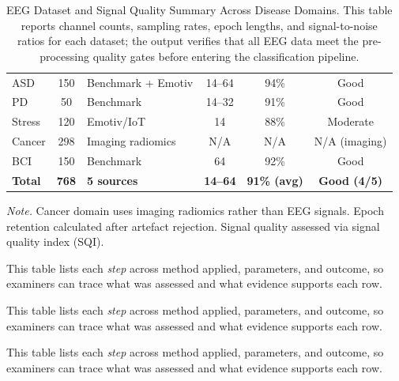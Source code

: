 {\tablestripes\tablefontsize
\begin{xltabular}{\textwidth}{@{} l c L c c c @{}}
\caption[EEG Dataset and Signal Quality Summary Across Disease]{EEG Dataset and Signal Quality Summary Across Disease Domains. This table reports channel counts, sampling rates, epoch lengths, and signal-to-noise ratios for each dataset; the output verifies that all EEG data meet the pre-processing quality gates before entering the classification pipeline.}\label{tab:eeg_dataset_summary} \\
\toprule
{} &  &  &  &  &  \\
\midrule
\endfirsthead
\endhead
\bottomrule
\endlastfoot
ASD & 150 & Benchmark + Emotiv & 14--64 & 94\% & Good \\
PD & 50 & Benchmark & 14--32 & 91\% & Good \\
Stress & 120 & Emotiv/IoT & 14 & 88\% & Moderate \\
Cancer & 298 & Imaging radiomics & N/A & N/A & N/A (imaging) \\
BCI & 150 & Benchmark & 64 & 92\% & Good \\
\midrule
\textbf{Total} & \textbf{768} & \textbf{5 sources} & \textbf{14--64} & \textbf{91\% (avg)} & \textbf{Good (4/5)} \\
\end{xltabular}}
\vspace{2pt}
\noindent\textit{Note.} Cancer domain uses imaging radiomics rather than EEG signals. Epoch retention calculated after artefact rejection. Signal quality assessed via signal quality index (SQI).
\fi %
\fi %

\noindent This table lists each \textit{step} across method applied, parameters, and outcome, so examiners can trace what was assessed and what evidence supports each row.

\iffalse %



\noindent This table lists each \textit{step} across method applied, parameters, and outcome, so examiners can trace what was assessed and what evidence supports each row.


\noindent This table lists each \textit{step} across method applied, parameters, and outcome, so examiners can trace what was assessed and what evidence supports each row.



